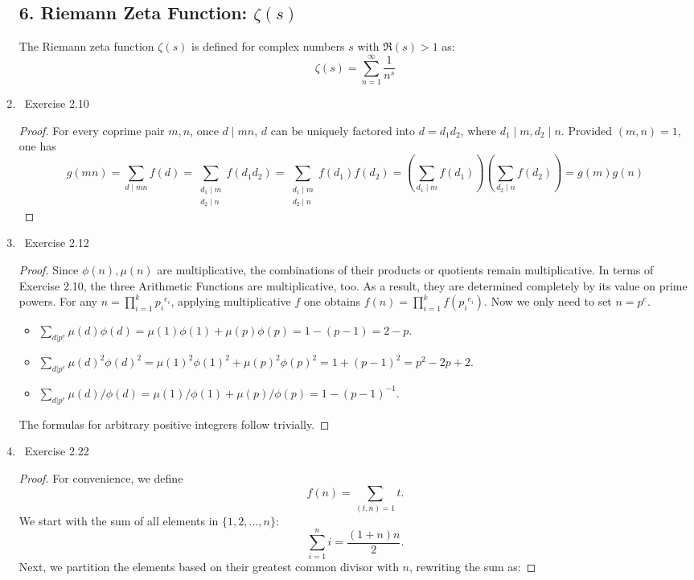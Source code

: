 \documentclass[11pt]{article}
\newcommand\0{\mathbf{0}}
\newcommand\<{\langle}
\renewcommand\>{\rangle}
\begin{document}
\begin{enumerate}
\subsection*{6. Riemann Zeta Function: \(\zeta(s)\)}
The Riemann zeta function \(\zeta(s)\) is defined for complex numbers \(s\) with \(\Re(s) > 1\) as:
\[
\zeta(s) = \sum_{n=1}^\infty \frac{1}{n^s}
\]
\item\ Exercise  2.10
\begin{proof}
    For every coprime pair $m,n$, once $d\mid mn$, $d$ can be uniquely factored into $d=d_1d_2$, where $d_1\mid m, d_2\mid n$.
    Provided $(m,n) = 1$,  one has 
\[
g(mn) = \sum_{d \mid mn} f(d) = \sum_{\substack{d_1 \mid m \\ d_2 \mid n}} f(d_1 d_2) = \sum_{\substack{d_1 \mid m \\ d_2 \mid n}} f(d_1) f(d_2) = \left( \sum_{d_1 \mid m} f(d_1) \right) \left( \sum_{d_2 \mid n} f(d_2) \right) = g(m) g(n)
\]
\end{proof}
\item\ Exercise  2.12
\begin{proof}
    Since $\phi(n), \mu(n)$ are multiplicative, the combinations of their products or quotients remain multiplicative. In terms of Exercise 2.10, 
    the three Arithmetic Functions are multiplicative, too. As a result, they are determined completely by its value on prime powers. For any 
    $n = \prod_{i=1}^{k}{p_i}^{e_i}$, applying multiplicative $f$ one obtains $f(n) = \prod_{i=1}^{k}f({p_i}^{e_i})$. Now we only need to set $n = p^e$.
    \begin{itemize}
        \item $\sum_{d|p^e}{\mu(d)\phi(d)} = \mu(1)\phi(1) + \mu(p)\phi(p) = 1 - (p-1) = 2 - p.$
        \item $\sum_{d|p^e}{\mu(d)^2\phi(d)^2} = \mu(1)^2\phi(1)^2 + \mu(p)^2\phi(p)^2 = 1 + (p-1)^2 = p^2 - 2p +2.$
        \item $\sum_{d|p^e}{\mu(d)/\phi(d)} = \mu(1)/\phi(1) + \mu(p)/\phi(p) = 1 - (p-1)^{-1}.$
    \end{itemize}
    The formulas for arbitrary positive integrers follow trivially.
\end{proof}
\item\ Exercise  2.22
\begin{proof}
    For convenience, we define  
    \[
    f(n) = \sum_{(t,n)=1} t.
    \]  
    We start with the sum of all elements in \(\{1,2,\dots,n\}\):  
    \[
    \sum_{i=1}^{n} i = \frac{(1+n)n}{2}.
    \]  
    Next, we partition the elements based on their greatest common divisor with \( n \), rewriting the sum as:  

\end{proof}
\end{enumerate}
\end{document}
